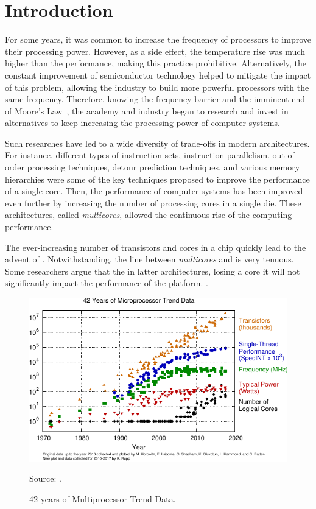 \chapter{Introduction}
\label{ch.intro}

	For some years, it was common to increase the frequency of processors
	to improve their processing power.
	However, as a side effect, the temperature rise was much higher than the
	performance, making this practice prohibitive.
	Alternatively, the constant improvement of semiconductor technology helped
	to mitigate the impact of this problem, allowing the industry to build
	more powerful processors with the same frequency.
	Therefore, knowing the frequency barrier and the imminent end of Moore's Law~\cite{moore:1965},
	the academy and industry began to research and invest in alternatives
	to keep increasing the processing power of computer systems.

	Such researches have led to a wide diversity of trade-offs in modern architectures.
	For instance, different types of instruction sets, instruction parallelism,
	out-of-order processing techniques, detour prediction techniques, and various
	memory hierarchies were some of the key techniques proposed to improve the
	performance of a single core.
	Then, the performance of computer systems has been improved even further by
	increasing the number of processing cores in a single die.
	These architectures, called \textit{multicores}, allowed the continuous
	rise of the computing performance.

	The ever-increasing number of transistors and cores in a chip quickly lead
	to the advent of \manycores.
	Notwithstanding, the line between \textit{multicores} and \manycores is very tenuous.
	Some researchers argue that the in latter architectures, losing a core it will not
	significantly impact the performance of the platform.
	.

	\begin{figure}[t]
		\centering
		\caption{42 years of Multiprocessor Trend Data.}
		
		\includegraphics[width=.85\textwidth]{images/42-years-processor-trend.pdf}

		Source: \cite{url:microprocessor-trend-data}.

		\label{fig.microprocessor-data}
	\end{figure}

